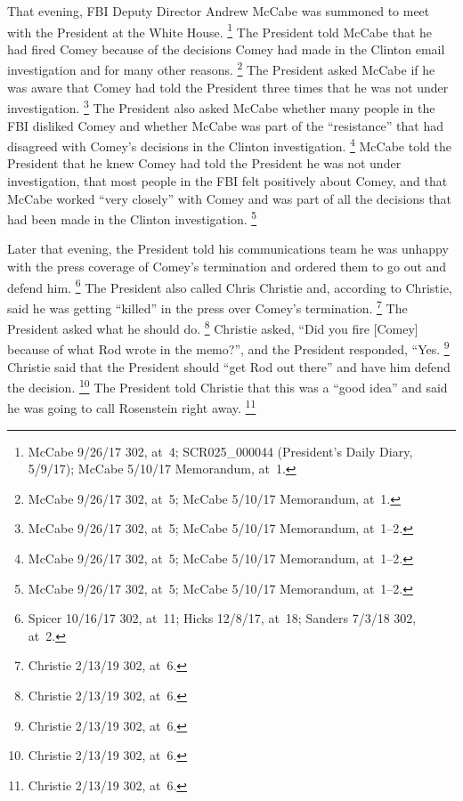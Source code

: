 That evening, FBI Deputy Director Andrew McCabe was summoned to meet with the President at the White House.%
\footnote{McCabe 9/26/17 302, at~4;
SCR025\_000044 (President's Daily Diary, 5/9/17);
McCabe 5/10/17 Memorandum, at~1.}
The President told McCabe that he had fired Comey because of the decisions Comey had made in the Clinton email investigation and for many other reasons.%
\footnote{McCabe 9/26/17 302, at~5;
McCabe 5/10/17 Memorandum, at~1.}
The President asked McCabe if he was aware that Comey had told the President three times that he was not under investigation.%
\footnote{McCabe 9/26/17 302, at~5;
McCabe 5/10/17 Memorandum, at~1--2.}
The President also asked McCabe whether many people in the FBI disliked Comey and whether McCabe was part of the ``resistance'' that had disagreed with Comey's decisions in the Clinton investigation.%
\footnote{McCabe 9/26/17 302, at~5;
McCabe 5/10/17 Memorandum, at~1--2.}
McCabe told the President that he knew Comey had told the President he was not under investigation, that most people in the FBI felt positively about Comey, and that McCabe worked ``very closely'' with Comey and was part of all the decisions that had been made in the Clinton investigation.%
\footnote{McCabe 9/26/17 302, at~5;
McCabe 5/10/17 Memorandum, at~1--2.}

Later that evening, the President told his communications team he was unhappy with the press coverage of Comey's termination and ordered them to go out and defend him.%
\footnote{Spicer 10/16/17 302, at~11;
Hicks 12/8/17, at~18;
Sanders 7/3/18 302, at~2.}
The President also called Chris Christie and, according to Christie, said he was getting ``killed'' in the press over Comey's termination.%
\footnote{Christie 2/13/19 302, at~6.}
The President asked what he should do.%
\footnote{Christie 2/13/19 302, at~6.}
Christie asked, ``Did you fire [Comey] because of what Rod wrote in the memo?'', and the President responded, ``Yes.%
\footnote{Christie 2/13/19 302, at~6.}
Christie said that the President should ``get Rod out there'' and have him defend the decision.%
\footnote{Christie 2/13/19 302, at~6.}
The President told Christie that this was a ``good idea'' and said he was going to call Rosenstein right away.%
\footnote{Christie 2/13/19 302, at~6.}

